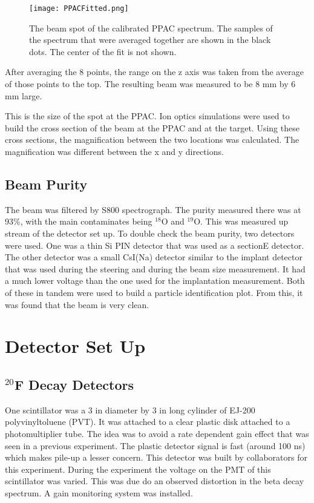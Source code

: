 \begin{figure}
	\texttt{[image: PPACFitted.png]}
	\caption{The beam spot of the calibrated PPAC spectrum. 
		 The samples of the spectrum that were averaged together are shown in the black dots.
		 The center of the fit is not shown.}
	\label{fig:PPACSpotch}
\end{figure}  

After averaging the 8 points, the range on the z axis was taken from the average of those points to the top.
The resulting beam was measured to be 8 mm by 6 mm large.

This is the size of the spot at the PPAC. 
Ion optics simulations were used to build the cross section of the beam at the PPAC and at the target.
Using these cross sections, the magnification between the two locations was calculated.
The magnification was different between the x and y directions.

\subsection{Beam Purity}

The beam was filtered by S800 spectrograph. 
The purity measured there was at 93\%, with the main contaminates being $^{18}$O and $^{19}$O. 
This was measured up stream of the detector set up.
To double check the beam purity, two detectors were used. 
One was a thin Si PIN detector that was used as a sectionE detector. 
The other detector was a small CsI(Na) detector similar to the implant detector that was used during the steering and during the beam size measurement. 
It had a much lower voltage than the one used for the implantation measurement. 
Both of these in tandem were used to build a particle identification plot.
From this, it was found that the beam is very clean.

\section{Detector Set Up}

\subsection{$^{20}$F Decay Detectors}
One scintillator was a 3 in diameter by 3 in long cylinder of EJ-200 polyvinyltoluene (PVT).
It was attached to a clear plastic disk attached to a photomultiplier tube.
The idea was to avoid a rate dependent gain effect that was seen in a previous experiment.
The plastic detector signal is fast (around 100 ns) which makes pile-up a lesser concern.
This detector was built by collaborators for this experiment.
During the experiment the voltage on the PMT of this scintillator was varied.
This was due do an observed distortion in the beta decay spectrum.
A gain monitoring system was installed.

